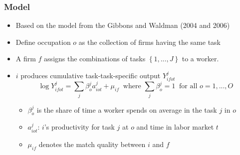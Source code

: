 \documentclass[11pt]{beamer}
\begin{document}
\begin{frame}
	\frametitle{Model}
	\begin{itemize}
		\item Based on the model from the Gibbons and Waldman (2004 and 2006)
		\item Define occupation $o$ as the collection of firms having the same task
		\item A firm $f$ assigns the combinations of tasks $\left\lbrace 1,...,J\right\rbrace $ to a worker.
		
%		
		\item $i$ produces cumulative task-task-specific output $Y_{ifot}^j$
		\begin{equation}
			\log{Y_{ifot}^j} = \sum_{j} \beta_{o}^{j} a_{iot}^j + \mu_{if} \;\;\text{where } \sum_{j} \beta_{o}^j = 1 \;\;\text{for all }o=1,...,O
		\end{equation}
		\begin{itemize}
			\item $\beta_{o}^{j} $ is the share of time a worker spends on average in the task $j$ in  $o$
			\vspace{0.8 mm}
			\item $a_{iot}^j$:  $i$'s productivity for task $j$ at  $o$ and time in labor market $t$
			\vspace{0.8 mm}
			\item $\mu_{if}$ denotes the match quality between $i$ and $f$ 
		\end{itemize}
	\end{itemize}
\end{frame}
\end{document}
